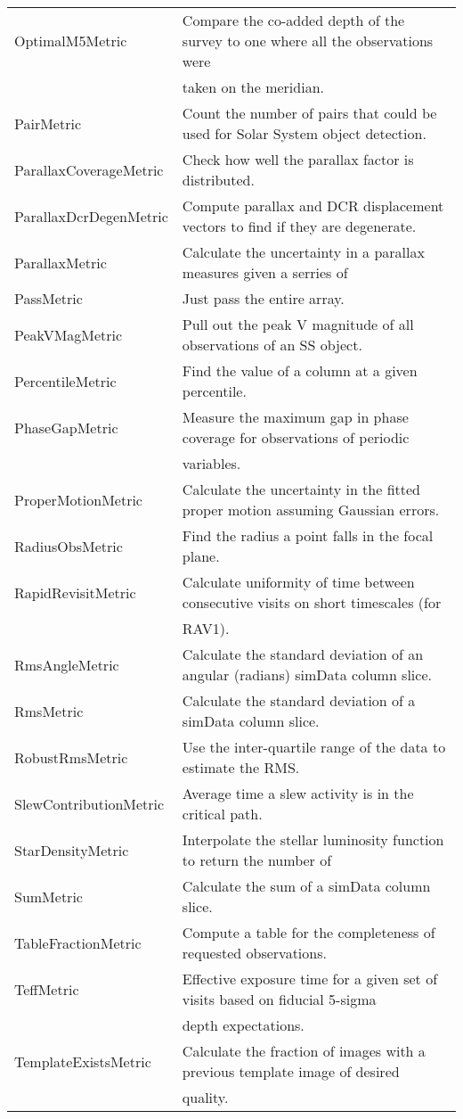 \begin{table}[!t]
\begin{tabular}{ll}
 OptimalM5Metric &  Compare the co-added depth of the survey to one where all the observations were \\
  &  taken on the meridian. \\
 PairMetric &  Count the number of pairs that could be used for Solar System object detection. \\
 ParallaxCoverageMetric &  Check how well the parallax factor is distributed. \\
 ParallaxDcrDegenMetric &  Compute parallax and DCR displacement vectors to find if they are degenerate. \\
 ParallaxMetric &  Calculate the uncertainty in a parallax measures given a serries of \\
 PassMetric &  Just pass the entire array. \\
 PeakVMagMetric &  Pull out the peak V magnitude of all observations of an SS object. \\
 PercentileMetric &  Find the value of a column at a given percentile. \\
 PhaseGapMetric &  Measure the maximum gap in phase coverage for observations of periodic \\
  &  variables. \\
 ProperMotionMetric &  Calculate the uncertainty in the fitted proper motion assuming Gaussian errors. \\
 RadiusObsMetric &  Find the radius a point falls in the focal plane. \\
 RapidRevisitMetric &  Calculate uniformity of time between consecutive visits on short timescales (for \\
  &  RAV1). \\
 RmsAngleMetric &  Calculate the standard deviation of an angular (radians) simData column slice. \\
 RmsMetric &  Calculate the standard deviation of a simData column slice. \\
 RobustRmsMetric &  Use the inter-quartile range of the data to estimate the RMS. \\
 SlewContributionMetric &  Average time a slew activity is in the critical path. \\
 StarDensityMetric &  Interpolate the stellar luminosity function to return the number of \\
 SumMetric &  Calculate the sum of a simData column slice. \\
 TableFractionMetric &  Compute a table for the completeness of requested observations. \\
 TeffMetric &  Effective exposure time for a given set of visits based on fiducial 5-sigma \\
  &  depth expectations. \\
 TemplateExistsMetric &  Calculate the fraction of images with a previous template image of desired \\
  &  quality. \\
\end{tabular}
\end{table}


